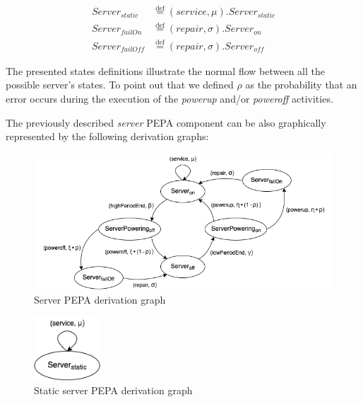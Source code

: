 \documentclass{article}
\newcommand*{\defeq}{\stackrel{\text{def}}{=}}
\begin{document}
\begin{align*}
    Server_{static} &\defeq (service, \mu).Server_{static} \\
    Server_{failOn} &\defeq (repair, \sigma).Server_{on} \\
    Server_{failOff} &\defeq (repair, \sigma).Server_{off}
\end{align*}

\noindent The presented states definitions illustrate the normal flow between all the possible server's states.\newline
To point out that we defined \(\rho\) as the probability that an error occurs during the execution of the \textit{powerup} and/or \textit{poweroff} activities.\newline

\par\noindent The previously described \textit{server} PEPA component can be also  graphically represented by the following derivation graphs:

\begin{figure}[H]
    \centering
    \includegraphics[width=1.0\textwidth]{server-derivation-graph.png}
    \caption{Server PEPA derivation graph}
    \label{fig:server-derivation-graph}
\end{figure}

\begin{figure}[H]
    \centering
    \includegraphics[width=2.5cm]{server-static-derivation-graph.png}
    \caption{Static server PEPA derivation graph}
    \label{fig:server-static-derivation-graph}
\end{figure}

\end{document}
